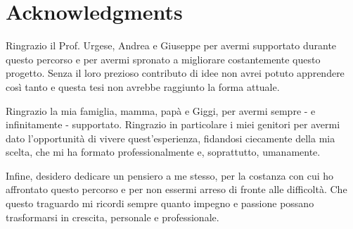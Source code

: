 \chapter*{Acknowledgments}

Ringrazio il Prof. Urgese, Andrea e Giuseppe per avermi supportato durante questo percorso e per avermi spronato a migliorare costantemente questo progetto.
Senza il loro prezioso contributo di idee non avrei potuto apprendere così tanto e questa tesi non avrebbe raggiunto la forma attuale.

\bigskip

Ringrazio la mia famiglia, mamma, papà e Giggi, per avermi sempre - e infinitamente - supportato.
Ringrazio in particolare i miei genitori per avermi dato l'opportunità di vivere quest'esperienza, fidandosi ciecamente della mia scelta, che mi ha formato professionalmente e, soprattutto, umanamente.

\bigskip

Infine, desidero dedicare un pensiero a me stesso, per la costanza con cui ho affrontato questo percorso e per non essermi arreso di fronte alle difficoltà.
Che questo traguardo mi ricordi sempre quanto impegno e passione possano trasformarsi in crescita, personale e professionale.
